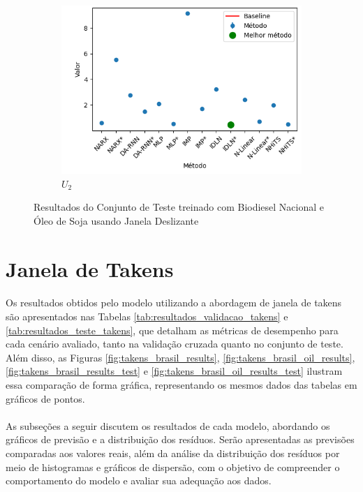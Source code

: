 \begin{figure}[htbp]
\begin{subfigure}[b]{0.3\textwidth}
		\includegraphics[width=\textwidth]{figuras/u2_brasil_oil_results_test.png}
		\caption{\(U_2\)}
		\label{fig:u2_brasil_oil_results_test}
	\end{subfigure}
	\caption{Resultados do Conjunto de Teste treinado com Biodiesel Nacional e Óleo de Soja usando Janela Deslizante}
	\label{fig:brasil_oil_results_test}
\end{figure}


\section{Janela de Takens}

\paragraph{} Os resultados obtidos pelo modelo utilizando a abordagem de janela de takens são apresentados nas Tabelas \ref{tab:resultados_validacao_takens} e \ref{tab:resultados_teste_takens}, que detalham as métricas de desempenho para cada cenário avaliado, tanto na validação cruzada quanto no conjunto de teste. Além disso, as Figuras \ref{fig:takens_brasil_results}, \ref{fig:takens_brasil_oil_results}, \ref{fig:takens_brasil_results_test} e \ref{fig:takens_brasil_oil_results_test} ilustram essa comparação de forma gráfica, representando os mesmos dados das tabelas em gráficos de pontos.
\paragraph{} As subseções a seguir discutem os resultados de cada modelo, abordando os gráficos de previsão e a distribuição dos resíduos. Serão apresentadas as previsões comparadas aos valores reais, além da análise da distribuição dos resíduos por meio de histogramas e gráficos de dispersão, com o objetivo de compreender o comportamento do modelo e avaliar sua adequação aos dados.

